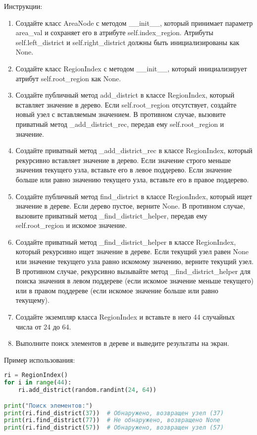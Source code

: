 \begin{enumerate}
Инструкции:
\begin{enumerate}
    \item Создайте класс AreaNode с методом \_\_init\_\_, который принимает параметр area\_val и сохраняет его в атрибуте self.index\_region. Атрибуты self.left\_district и self.right\_district должны быть инициализированы как None.
    \item Создайте класс RegionIndex с методом \_\_init\_\_, который инициализирует атрибут self.root\_region как None.
    \item Создайте публичный метод add\_district в классе RegionIndex, который вставляет значение в дерево. Если self.root\_region отсутствует, создайте новый узел с вставляемым значением. В противном случае, вызовите приватный метод \_add\_district\_rec, передав ему self.root\_region и значение.
    \item Создайте приватный метод \_add\_district\_rec в классе RegionIndex, который рекурсивно вставляет значение в дерево. Если значение строго меньше значения текущего узла, вставьте его в левое поддерево. Если значение больше или равно значению текущего узла, вставьте его в правое поддерево.
    \item Создайте публичный метод find\_district в классе RegionIndex, который ищет значение в дереве. Если дерево пустое, верните None. В противном случае, вызовите приватный метод \_find\_district\_helper, передав ему self.root\_region и искомое значение.
    \item Создайте приватный метод \_find\_district\_helper в классе RegionIndex, который рекурсивно ищет значение в дереве. Если текущий узел равен None или значение текущего узла равно искомому значению, верните текущий узел. В противном случае, рекурсивно вызывайте метод \_find\_district\_helper для поиска значения в левом поддереве (если искомое значение меньше текущего) или в правом поддереве (если искомое значение больше или равно текущему).
    \item Создайте экземпляр класса RegionIndex и вставьте в него 44 случайных числа от 24 до 64.
    \item Выполните поиск элементов в дереве и выведите результаты на экран.
\end{enumerate}

Пример использования:
\begin{lstlisting}[language=Python]
ri = RegionIndex()
for i in range(44):
    ri.add_district(random.randint(24, 64))

print("Поиск элементов:")
print(ri.find_district(37))  # Обнаружено, возвращен узел (37)
print(ri.find_district(77))  # Не обнаружено, возвращено None
print(ri.find_district(57))  # Обнаружено, возвращен узел (57)
\end{lstlisting}


\end{enumerate}
